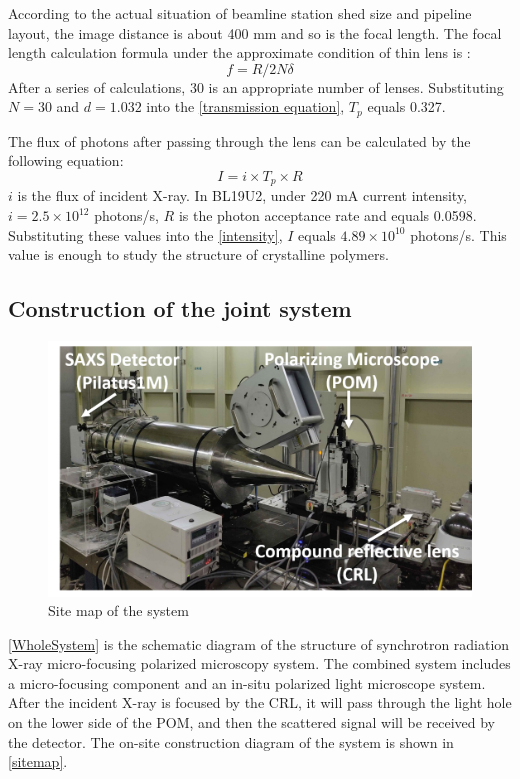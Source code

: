 \documentclass{Head}
\begin{document}
According to the actual situation of beamline station shed size and pipeline layout, the image distance is about 400 mm and so is the focal length.
The focal length calculation formula under the approximate condition of thin lens is :
\begin{equation}
    f=R/2N\delta
\end{equation}
After a series of calculations, 30 is an appropriate number of lenses.
Substituting $N=30$ and $d=1.032$ into the \autoref{transmission equation}, $T_p$ equals 0.327.


The flux of photons after passing through the lens can be calculated by the following equation:
\begin{equation}
    I=i\times T_p \times R
    \label{intensity}
\end{equation}
$i$ is the flux of incident X-ray.
In BL19U2, under 220 mA current intensity, $i=2.5\times 10^{12}$ photons/s, $R$ is the photon acceptance rate and equals 0.0598.
Substituting these values into the \autoref{intensity}, $I$ equals $4.89\times 10^{10}$ photons/s. This value is enough to study the structure of crystalline polymers.
\subsection{Construction of the joint system}
\begin{figure}
    \centering
    \includegraphics[scale=0.5]{Figures/Fig4SiteMap.png}
    \caption{Site map of the system}
    \label{sitemap}
\end{figure}
\autoref{WholeSystem} is the schematic diagram of the structure of synchrotron radiation X-ray micro-focusing polarized microscopy system.
The combined system includes a micro-focusing component and an in-situ polarized light microscope system.
After the incident X-ray is focused by the CRL, it will pass through the light hole on the lower side of the POM, and then the scattered signal will be received by the detector.
The on-site construction diagram of the system is shown in \autoref{sitemap}.
\end{document}
